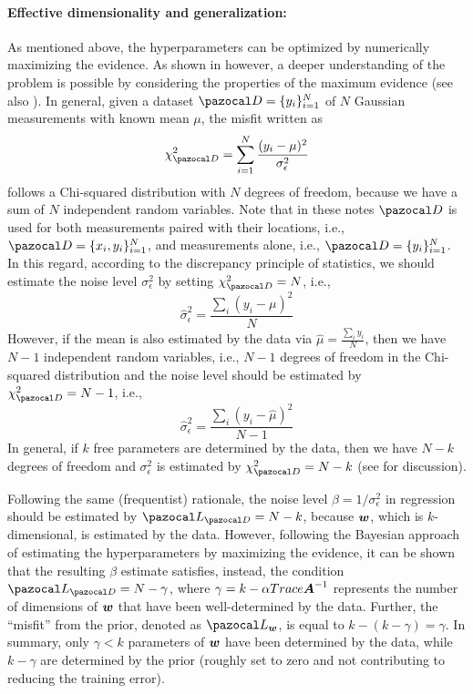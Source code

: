 \paragraph{Effective dimensionality and generalization:}\label{sec:effective}
As mentioned above, the hyperparameters can be optimized by numerically maximizing the evidence. 
As shown in \textcite{mackay1992bayesian} however, a deeper understanding of the problem is possible by considering the properties of the maximum evidence (see also \cite{maddox2020rethinking}).
In general, given a dataset $\cD=\{y_i\}_{i=1}^N$ of $N$ Gaussian measurements with known mean $\mu$, the misfit written as
\begin{equation}
\chi^2_{\cD} = \sum_{i=1}^{N}\frac{(y_i-\mu)^2}{\sigma_{\epsilon}^2}
\end{equation}
follows a Chi-squared distribution with $N$ degrees of freedom, because we have a sum of $N$ independent random variables.
Note that in these notes $\cD$ is used for both measurements paired with their locations, i.e., $\cD=\{x_i,y_i\}_{i=1}^N$, and measurements alone, i.e., $\cD=\{y_i\}_{i=1}^N$.
In this regard, according to the discrepancy principle of statistics, we should estimate the noise level $\sigma_{\epsilon}^2$ by setting $\chi^2_{\cD} = N$, i.e., 
\begin{equation}
\hat{\sigma}_{\epsilon}^2 = \frac{\sum_i (y_i-\mu)^2}{N}
\end{equation}
However, if the mean is also estimated by the data via $\hat{\mu}=\frac{\sum_i y_i}{N}$, then we have $N-1$ independent random variables, i.e., $N-1$ degrees of freedom in the Chi-squared distribution and the noise level should be estimated by $\chi^2_{\cD}=N-1$, i.e.,
\begin{equation}
\hat{\sigma}_{\epsilon}^2 = \frac{\sum_i (y_i-\hat{\mu})^2}{N-1}
\end{equation}
In general, if $k$ free parameters are determined by the data, then we have $N-k$ degrees of freedom and $\sigma_{\epsilon}^2$ is estimated by $\chi^2_{\cD}=N-k$ (see \cite{mackay1992bayesian} for discussion).

Following the same (frequentist) rationale, the noise level $\beta = 1/\sigma_{\epsilon}^2$ in regression should be estimated by $\cL_{\cD}=N-k$, because $\boldsymbol{w}$, which is $k$-dimensional, is estimated by the data. 
However, following the Bayesian approach of estimating the hyperparameters by maximizing the evidence, it can be shown that the resulting $\beta$ estimate satisfies, instead, the condition $\cL_{\cD}=N-\gamma$, where $\gamma = k-\alpha Trace\boldsymbol{A}^{-1}$ represents the number of dimensions of $\boldsymbol{w}$ that have been well-determined by the data. 
Further, the ``misfit'' from the prior, denoted as $\cL_{\bw}$, is equal to $k-(k-\gamma)=\gamma$. 
In summary, only $\gamma <k$ parameters of $\boldsymbol{w}$ have been determined by the data, while $k-\gamma$ are determined by the prior (roughly set to zero and not contributing to reducing the training error).

